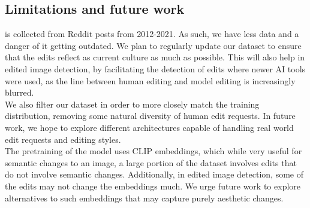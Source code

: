 \subsection{Limitations and future work}
\ours is collected from Reddit posts from 2012-2021. As such, we have less data and a danger of it getting outdated. We plan to regularly update our dataset to ensure that the edits reflect as current culture as much as possible. This will also help in edited image detection, by facilitating the detection of edits where newer AI tools were used, as the line between human editing and model editing is increasingly blurred. \\
We also filter our dataset in order to more closely match the training distribution, removing some natural diversity of human edit requests. In future work, we hope to explore different architectures capable of handling real world edit requests and editing styles. \\
The pretraining of the \ours model uses CLIP embeddings, which while very useful for semantic changes to an image, a large portion of the \ours dataset involves edits that do not involve semantic changes. Additionally, in edited image detection, some of the edits may not change the embeddings much. We urge future work to explore alternatives to such embeddings that may capture purely aesthetic changes.

